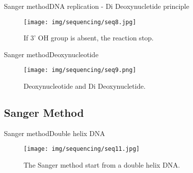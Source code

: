 \documentclass[10pt]{beamer}
\newcommand{\1}{
	\setbeamertemplate{background}{
		\texttt{[image: img/1]}
		\tikz[overlay] \fill[fill opacity=0.75,fill=white] (0,0) rectangle (-\paperwidth,\paperheight);
	}
}
\begin{document}
\begin{frame}{Sanger method}{DNA replication - Di Deoxynucletide principle}
	\begin{figure}[]
		\centering
		\texttt{[image: img/sequencing/seq8.jpg]}
		\label{img:mot2}
		\caption{If 3' OH group is absent, the reaction stop.}
	\end{figure}
\end{frame}

\begin{frame}{Sanger method}{Deoxynucleotide}
	\begin{figure}[]
		\centering
		\texttt{[image: img/sequencing/seq9.png]}
		\label{img:mot2}
		\caption{Deoxynucleotide and Di Deoxynucletide.}
	\end{figure}
\end{frame}

\subsection{Sanger Method}

\begin{frame}{Sanger method}{Double helix DNA}
	\begin{figure}[]
		\centering
		\texttt{[image: img/sequencing/seq11.jpg]}
		\label{img:mot2}
		\caption{The Sanger method start from a double helix DNA.}
	\end{figure}
\end{frame}
\end{document}
